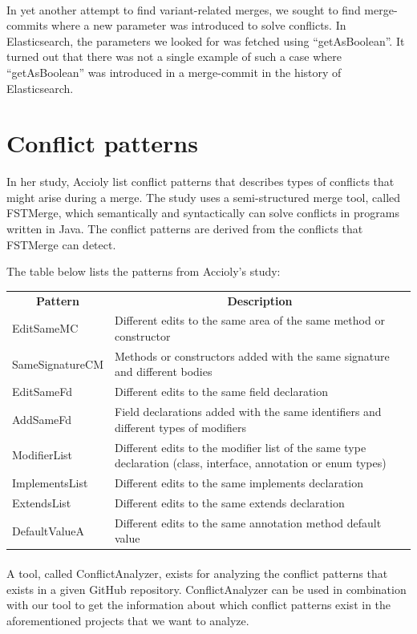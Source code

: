 \paragraph*{}
In yet another attempt to find variant-related merges, we sought to find merge-commits where a new parameter was introduced to solve conflicts. In Elasticsearch, the parameters we looked for was fetched using “getAsBoolean”. It turned out that there was not a single example of such a case where “getAsBoolean” was introduced in a merge-commit in the history of Elasticsearch.
\section{Conflict patterns}
In her study, Accioly list conflict patterns that describes types of conflicts that might arise during a merge. The study uses a semi-structured merge tool, called FSTMerge, which semantically and syntactically can solve conflicts in programs written in Java. The conflict patterns are derived from the conflicts that FSTMerge can detect.

The table below lists the patterns from Accioly’s study:\\
\begin{tabular}{ l l}
\hline
\multicolumn{1}{c}{\textbf{Pattern}} & \multicolumn{1}{c}{\textbf{Description}}\\
EditSameMC & Different edits to the same area of the same method or constructor\\
SameSignatureCM & Methods or constructors added with the same signature and different bodies\\
EditSameFd & Different edits to the same field declaration\\
AddSameFd & Field declarations added with the same identifiers and different types of modifiers\\
ModifierList & Different edits to the modifier list of the same type declaration (class, interface, annotation or enum types)\\
ImplementsList & Different edits to the same implements declaration\\
ExtendsList & Different edits to the same extends declaration\\
DefaultValueA & Different edits to the same annotation method default value
\end{tabular}

\paragraph*{}
A tool, called ConflictAnalyzer, exists for analyzing the conflict patterns that exists in a given GitHub repository. ConflictAnalyzer can be used in combination with our tool to get the information about which conflict patterns exist in the aforementioned projects that we want to analyze.
